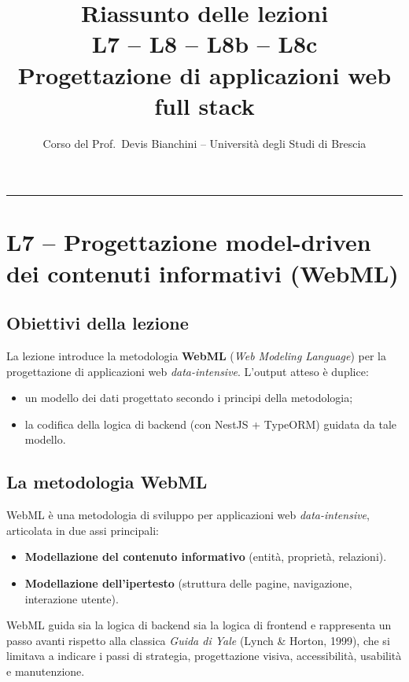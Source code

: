 \documentclass[11pt,a4paper]{article}
\title{\bfseries Riassunto delle lezioni\\[4pt]
\large L7 -- L8 -- L8b -- L8c\\[6pt]
\normalsize Progettazione di applicazioni web full stack}
\author{Corso del Prof.\ Devis Bianchini -- Universit\`a degli Studi di Brescia}
\date{}
\begin{document}
\maketitle

\tableofcontents
\bigskip\hrule\bigskip

\section{L7 -- Progettazione model-driven dei contenuti informativi (WebML)}

\subsection{Obiettivi della lezione}

La lezione introduce la metodologia \textbf{WebML} (\emph{Web Modeling Language}) per la progettazione di applicazioni web \emph{data-intensive}. L'output atteso \`e duplice:
\begin{itemize}[leftmargin=*]
    \item un modello dei dati progettato secondo i principi della metodologia;
    \item la codifica della logica di backend (con NestJS + TypeORM) guidata da tale modello.
\end{itemize}

\subsection{La metodologia WebML}

WebML \`e una metodologia di sviluppo per applicazioni web \emph{data-intensive}, articolata in due assi principali:
\begin{itemize}[leftmargin=*]
    \item \textbf{Modellazione del contenuto informativo} (entit\`a, propriet\`a, relazioni).
    \item \textbf{Modellazione dell'ipertesto} (struttura delle pagine, navigazione, interazione utente).
\end{itemize}

WebML guida sia la logica di backend sia la logica di frontend e rappresenta un passo avanti rispetto alla classica \emph{Guida di Yale} (Lynch \& Horton, 1999), che si limitava a indicare i passi di strategia, progettazione visiva, accessibilit\`a, usabilit\`a e manutenzione.
\end{document}
